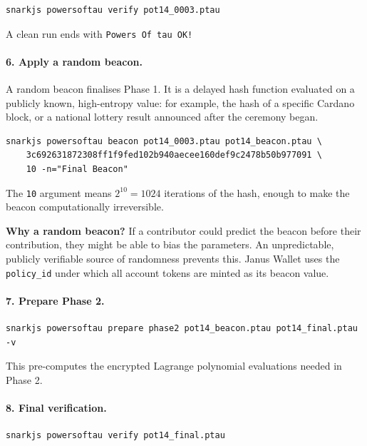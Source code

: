 \begin{verbatim}
snarkjs powersoftau verify pot14_0003.ptau
\end{verbatim}

A clean run ends with \texttt{Powers Of tau OK!}

\paragraph{6. Apply a random beacon.}

A random beacon finalises Phase 1. It is a delayed hash function evaluated on a publicly known, high-entropy value: for example, the hash of a specific Cardano block, or a national lottery result announced after the ceremony began.

\begin{verbatim}
snarkjs powersoftau beacon pot14_0003.ptau pot14_beacon.ptau \
    3c692631872308ff1f9fed102b940aecee160def9c2478b50b977091 \
    10 -n="Final Beacon"
\end{verbatim}

The \texttt{10} argument means $2^{10} = 1024$ iterations of the hash, enough to make the beacon computationally irreversible.

\begin{highlight}
\textbf{Why a random beacon?} If a contributor could predict the beacon before their contribution, they might be able to bias the parameters. An unpredictable, publicly verifiable source of randomness prevents this. Janus Wallet uses the \texttt{policy\_id} under which all account tokens are minted as its beacon value.
\end{highlight}

\paragraph{7. Prepare Phase 2.}

\begin{verbatim}
snarkjs powersoftau prepare phase2 pot14_beacon.ptau pot14_final.ptau -v
\end{verbatim}

This pre-computes the encrypted Lagrange polynomial evaluations needed in Phase 2.

\paragraph{8. Final verification.}

\begin{verbatim}
snarkjs powersoftau verify pot14_final.ptau
\end{verbatim}

